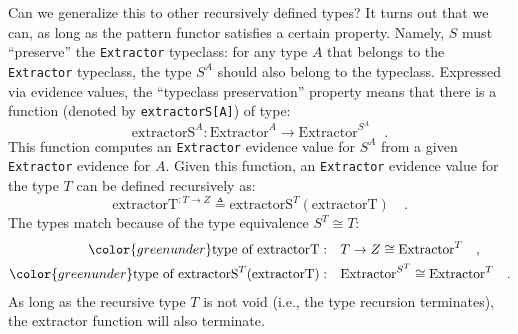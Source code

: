 Can we generalize this to other recursively defined types? It turns
out that we can, as long as the pattern functor satisfies a certain
property. Namely, $S$ must \textsf{``}preserve\textsf{''} the \lstinline!Extractor!
typeclass: for any type $A$ that belongs to the \lstinline!Extractor!
typeclass, the type $S^{A}$ should also belong to the typeclass.
Expressed via evidence values, the \textsf{``}typeclass preservation\textsf{''} property
means that there is a function (denoted by \lstinline!extractorS[A]!)
of type:
\[
\text{extractorS}^{A}:\text{Extractor}^{A}\rightarrow\text{Extractor}^{S^{A}}\quad.
\]
This function computes an \lstinline!Extractor! evidence value for
$S^{A}$ from a given \lstinline!Extractor! evidence for $A$. Given
this function, an \lstinline!Extractor! evidence value for the type
$T$ can be defined recursively as: 
\begin{equation}
\text{extractorT}^{:T\rightarrow Z}\triangleq\text{extractorS}^{T}(\text{extractorT})\quad.\label{eq:recursive-extractor-def}
\end{equation}
The types match because of the type equivalence $S^{T}\cong T$:
\begin{align*}
{\color{greenunder}\text{type of }\text{extractorT}:}\quad & T\rightarrow Z\cong\text{Extractor}^{T}\quad,\\
{\color{greenunder}\text{type of }\text{extractorS}^{T}(\text{extractorT}):}\quad & \text{Extractor}^{S^{T}}\cong\text{Extractor}^{T}\quad.
\end{align*}
As long as the recursive type $T$ is not void (i.e., the type recursion
terminates), the extractor function will also terminate.


